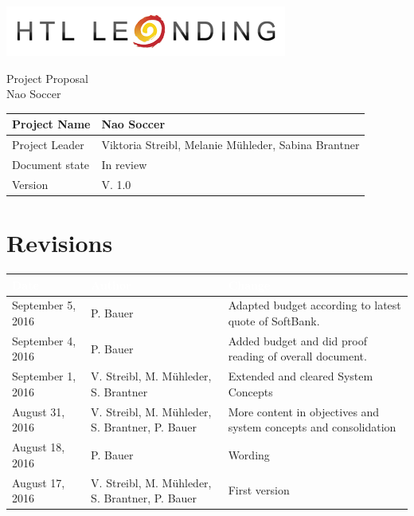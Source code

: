 \documentclass[12pt]{article}
\theoremstyle{definition}
\newcommand{\projectname}{Nao Soccer}
\newcommand{\productname}{Nao Soccer}
\newcommand{\projectleader}{Viktoria Streibl, Melanie Mühleder, Sabina Brantner}
\newcommand{\documentstatus}{In review}
\newcommand{\version}{V. 1.0}
\begin{document}
\begin{titlepage}
\begin{flushright}
\includegraphics[scale=.5]{htlleondinglogo.png}\\
\end{flushright}

\vspace{10em}

\begin{center}
{\Huge Project Proposal} \\[3em]
{\LARGE \productname} \\[3em]
\end{center}

\begin{flushleft}
\begin{tabular}{|l|l|}
\hline
Project Name & \projectname \\ \hline
Project Leader & \projectleader \\ \hline
Document state & \documentstatus \\ \hline
Version & \version \\ \hline
\end{tabular}
\end{flushleft}

\end{titlepage}
\section*{Revisions}
\begin{tabular}{|p{.25\linewidth}|p{.3\linewidth}|p{.37\linewidth}|}
\hline
\cellcolor[gray]{0.5}\textcolor{white}{Date} & \cellcolor[gray]{0.45}\textcolor{white}{Author} & \cellcolor[gray]{0.5}\textcolor{white}{Change} \\ \hline
September 5, 2016&P. Bauer&Adapted budget according to latest quote of SoftBank. \\ \hline
September 4, 2016&P. Bauer&Added budget and did proof reading of overall document. \\ \hline
September 1, 2016&V. Streibl, M. Mühleder, S. Brantner&Extended and cleared System Concepts \\ \hline
August 31, 2016&V. Streibl, M. Mühleder, S. Brantner, P. Bauer&More content in objectives and system concepts and consolidation \\ \hline
August 18, 2016&P. Bauer&Wording \\ \hline
August 17, 2016&V. Streibl, M. Mühleder, S. Brantner, P. Bauer&First version \\ \hline
\end{tabular}
\pagebreak
\end{document}
